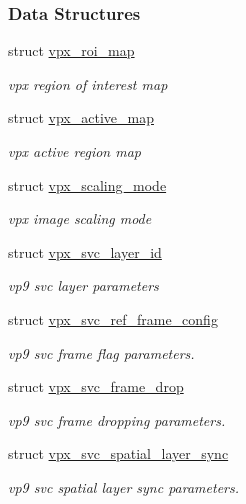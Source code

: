 \subsubsection*{Data Structures}
\begin{DoxyCompactItemize}
\item 
struct \hyperlink{structvpx__roi__map}{vpx\+\_\+roi\+\_\+map}
\begin{DoxyCompactList}\small\item\em vpx region of interest map \end{DoxyCompactList}\item 
struct \hyperlink{structvpx__active__map}{vpx\+\_\+active\+\_\+map}
\begin{DoxyCompactList}\small\item\em vpx active region map \end{DoxyCompactList}\item 
struct \hyperlink{structvpx__scaling__mode}{vpx\+\_\+scaling\+\_\+mode}
\begin{DoxyCompactList}\small\item\em vpx image scaling mode \end{DoxyCompactList}\item 
struct \hyperlink{structvpx__svc__layer__id}{vpx\+\_\+svc\+\_\+layer\+\_\+id}
\begin{DoxyCompactList}\small\item\em vp9 svc layer parameters \end{DoxyCompactList}\item 
struct \hyperlink{structvpx__svc__ref__frame__config}{vpx\+\_\+svc\+\_\+ref\+\_\+frame\+\_\+config}
\begin{DoxyCompactList}\small\item\em vp9 svc frame flag parameters. \end{DoxyCompactList}\item 
struct \hyperlink{structvpx__svc__frame__drop}{vpx\+\_\+svc\+\_\+frame\+\_\+drop}
\begin{DoxyCompactList}\small\item\em vp9 svc frame dropping parameters. \end{DoxyCompactList}\item 
struct \hyperlink{structvpx__svc__spatial__layer__sync}{vpx\+\_\+svc\+\_\+spatial\+\_\+layer\+\_\+sync}
\begin{DoxyCompactList}\small\item\em vp9 svc spatial layer sync parameters. \end{DoxyCompactList}\end{DoxyCompactItemize}
